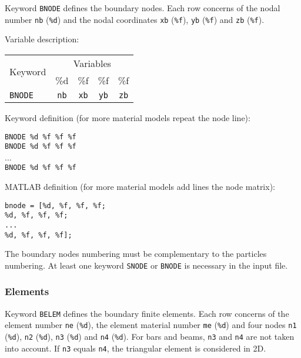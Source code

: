 Keyword \texttt{BNODE} defines the boundary nodes. Each row concerns of the nodal number \texttt{nb} (\texttt{\%d}) and the nodal coordinates \texttt{xb} (\texttt{\%f}), \texttt{yb} (\texttt{\%f}) and \texttt{zb} (\texttt{\%f}).

Variable description:

\begin{tabular}{|l|c|c|c|c|}
\hline
\multirow{2}{*}{Keyword} & \multicolumn{4}{c|}{Variables} \\ \cline{2-5}
& \%d & \%f & \%f & \%f \\ \hline
\texttt{BNODE} & \texttt{nb} & \texttt{xb} & \texttt{yb} & \texttt{zb} \\ \hline
\end{tabular}

Keyword definition (for more material models repeat the node line):

\begin{tcolorbox}
\texttt{BNODE \%d \%f \%f \%f} \\
\texttt{BNODE \%d \%f \%f \%f} \\
... \\
\texttt{BNODE \%d \%f \%f \%f}
\end{tcolorbox}

MATLAB definition (for more material models add lines the node matrix):

\begin{tcolorbox}
\texttt{bnode = [\%d, \%f, \%f, \%f; \\
\%d, \%f, \%f, \%f; \\
... \\
\%d, \%f, \%f, \%f];}
\end{tcolorbox}

The boundary nodes numbering must be complementary to the particles numbering. At least one keyword \texttt{SNODE} or \texttt{BNODE} is necessary in the input file.

\newpage


\subsubsection{Elements}

Keyword \texttt{BELEM} defines the boundary finite elements. Each row concerns of the element number \texttt{ne} (\texttt{\%d}), the element material number \texttt{me} (\texttt{\%d}) and four nodes \texttt{n1} (\texttt{\%d}), \texttt{n2} (\texttt{\%d}), \texttt{n3} (\texttt{\%d}) and \texttt{n4} (\texttt{\%d}). For bars and beams, \texttt{n3} and \texttt{n4} are not taken into account. If \texttt{n3} equals \texttt{n4}, the triangular element is considered in 2D. 

